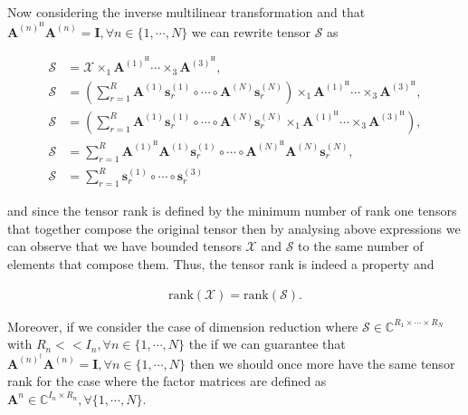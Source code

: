 \documentclass[a4paper,10pt]{article}
\begin{document}
\begin{enumerate}
        Now considering the inverse multilinear transformation and that $\boldsymbol{A}^{(n)^{\text{H}}} \boldsymbol{A}^{(n)} = \boldsymbol{I}, \forall n \in \{1, \cdots, N\}$ we can rewrite tensor $\mathcal{S}$ as

        \begin{align}
            \mathcal{S} &= \mathcal{X} \times_{1} \boldsymbol{A}^{(1)^{\text{H}}} \cdots \times_{3} \boldsymbol{A}^{(3)^{\text{H}}}, \\
            \mathcal{S} &= \left(\sum^{R}_{r = 1} \boldsymbol{A}^{(1)} \boldsymbol{s}^{(1)}_{r} \circ \cdots \circ \boldsymbol{A}^{(N)} \boldsymbol{s}^{(N)}_{r} \right) \times_{1} \boldsymbol{A}^{(1)^{\text{H}}} \cdots \times_{3} \boldsymbol{A}^{(3)^{\text{H}}}, \\
            \mathcal{S} &= \left(\sum^{R}_{r = 1} \boldsymbol{A}^{(1)} \boldsymbol{s}^{(1)}_{r} \circ \cdots \circ \boldsymbol{A}^{(N)} \boldsymbol{s}^{(N)}_{r} \times_{1} \boldsymbol{A}^{(1)^{\text{H}}} \cdots \times_{3} \boldsymbol{A}^{(3)^{\text{H}}} \right), \\
            \mathcal{S} &= \sum^{R}_{r = 1} \boldsymbol{A}^{(1)^{\text{H}}} \boldsymbol{A}^{(1)} \boldsymbol{s}^{(1)}_{r} \circ \cdots \circ \boldsymbol{A}^{(N)^{\text{H}}} \boldsymbol{A}^{(N)} \boldsymbol{s}^{(N)}_{r}, \\
            \mathcal{S} &= \sum^{R}_{r = 1} \boldsymbol{s}^{(1)}_{r} \circ \cdots \circ \boldsymbol{s}^{(3)}_{r}
        \end{align}

        and since the tensor rank is defined by the minimum number of rank one tensors that together compose the original tensor then by analysing above expressions we can observe that we have bounded tensors 
        $\mathcal{X}$ and $\mathcal{S}$ to the same number of elements that compose them. Thus, the tensor rank is indeed a property and

        \begin{align}
            \text{rank}\left(\mathcal{X}\right) = \text{rank}\left(\mathcal{S}\right).
        \end{align}

        Moreover, if we consider the case of dimension reduction where $\mathcal{S} \in \mathbb{C}^{R_{1} \times \cdots \times R_{N}}$ with $R_{n} << I_{n}, \forall n \in \{1, \cdots, N\}$ the if we can guarantee that
        $\boldsymbol{A}^{(n)^{\dagger}} \boldsymbol{A}^{(n)} = \boldsymbol{I}, \forall n \in \{1, \cdots, N\}$ then we should once more have the same tensor rank for the case where the factor matrices are defined as $\boldsymbol{A}^{n} \in \mathbb{C}^{I_{n} \times R_{n}}, \forall \{1, \cdots, N\}$.
        

\end{enumerate}
\end{document}
